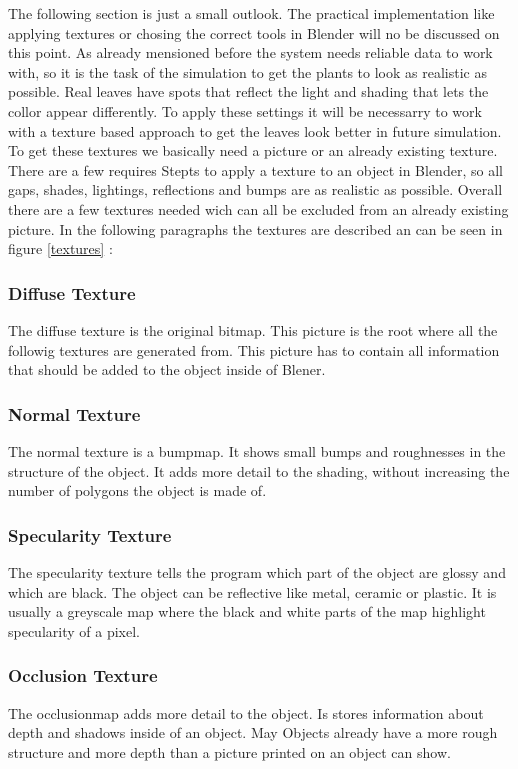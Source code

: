 The following section is just a small outlook. The practical implementation like applying textures or chosing the correct tools in Blender will no be discussed on this point.\newline
As already mensioned before the system needs reliable data to work with, so it is the task of the simulation to get the plants to look as realistic as possible. Real leaves have spots that reflect the light and shading that lets the collor appear differently. To apply these settings it will be necessarry to work with a texture based approach to get the leaves look better in future simulation. 
To get these textures we basically need a picture or an already existing texture. There are a few requires Stepts to apply a texture to an object in Blender, so all gaps, shades, lightings, reflections and bumps are as realistic as possible.
Overall there are a few textures needed wich can all be excluded from an already existing picture.
In the following paragraphs the textures are described an can be seen in figure \ref{textures} :

\subsubsection*{Diffuse Texture}
The diffuse texture is the original bitmap. This picture is the root where all the followig textures are generated from. This picture has to contain all information that should be added to the object inside of Blener.
\subsubsection*{Normal Texture}
The normal texture is a bumpmap. It shows small bumps and roughnesses in the structure of the object. It adds more detail to the shading, without increasing the number of polygons the object is made of. 
\subsubsection*{Specularity Texture}
The specularity texture tells the program which part of the object are glossy and which are black. The object can be reflective like metal, ceramic or plastic. It is usually a greyscale map where the black and white parts of the map highlight specularity of a pixel.
\subsubsection*{Occlusion Texture}
The occlusionmap adds more detail to the object. Is stores information about depth and shadows inside of an object. May Objects already have a more rough structure and more depth than a picture printed on an object can show.
